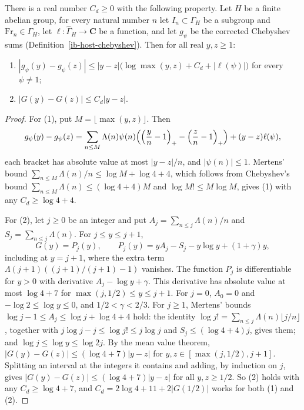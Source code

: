 \begin{lemma}\label{ib-chebyshev-lipschitz}
There is a real number $C_d\geq0$ with the following property. Let $H$ be a
finite abelian group, for every natural number $n$ let $I_n\subset\Gamma_H$ be a
subgroup and $\mathrm{Fr}_n\in\Gamma_H$, let $\ell:\widehat\Gamma_H\to\mathbf C$
be a function, and let $g_\psi$ be the corrected Chebyshev sums
(Definition~\ref{ib-host-chebyshev}). Then for all real $y,z\geq1$:
\begin{enumerate}
\item $|g_\psi(y)-g_\psi(z)|\leq|y-z|\bigl(\log\max(y,z)+C_d+|\ell(\psi)|\bigr)$
  for every $\psi\neq1$;
\item $|G(y)-G(z)|\leq C_d|y-z|$.
\end{enumerate}
\end{lemma}
\begin{proof}
For (1), put $M=\lfloor\max(y,z)\rfloor$. Then
\[
 g_\psi(y)-g_\psi(z)=\sum_{n\leq M}\Lambda(n)\psi(n)\Bigl(\Bigl(\frac yn-1\Bigr)_+
 -\Bigl(\frac zn-1\Bigr)_+\Bigr)+(y-z)\ell(\psi),
\]
each bracket has absolute value at most $|y-z|/n$, and $|\psi(n)|\leq1$. Mertens'
bound $\sum_{n\leq M}\Lambda(n)/n\leq\log M+\log4+4$, which follows from
Chebyshev's bound $\sum_{n\leq M}\Lambda(n)\leq(\log4+4)M$ and
$\log M!\leq M\log M$, gives (1) with any $C_d\geq\log4+4$.

For (2), let $j\geq0$ be an integer and put $A_j=\sum_{n\leq j}\Lambda(n)/n$ and
$S_j=\sum_{n\leq j}\Lambda(n)$. For $j\leq y\leq j+1$,
\[
 G(y)=P_j(y),\qquad P_j(y)=yA_j-S_j-y\log y+(1+\gamma)y,
\]
including at $y=j+1$, where the extra term $\Lambda(j+1)((j+1)/(j+1)-1)$ vanishes.
The function $P_j$ is differentiable for $y>0$ with derivative
$A_j-\log y+\gamma$. This derivative has absolute value at most $\log4+7$ for
$\max(j,1/2)\leq y\leq j+1$. For $j=0$, $A_0=0$ and $-\log2\leq\log y\leq0$, and
$1/2<\gamma<2/3$. For $j\geq1$, Mertens' bounds
$\log j-1\leq A_j\leq\log j+\log4+4$ hold: the identity
$\log j!=\sum_{n\leq j}\Lambda(n)\lfloor j/n\rfloor$, together with
$j\log j-j\leq\log j!\leq j\log j$ and $S_j\leq(\log4+4)j$, gives them; and
$\log j\leq\log y\leq\log2j$. By the mean value theorem,
$|G(y)-G(z)|\leq(\log4+7)|y-z|$ for $y,z\in[\max(j,1/2),j+1]$. Splitting an
interval at the integers it contains and adding, by induction on $j$, gives
$|G(y)-G(z)|\leq(\log4+7)|y-z|$ for all $y,z\geq1/2$. So (2) holds with any
$C_d\geq\log4+7$, and $C_d=2\log4+11+2|G(1/2)|$ works for both (1) and (2).
\end{proof}

